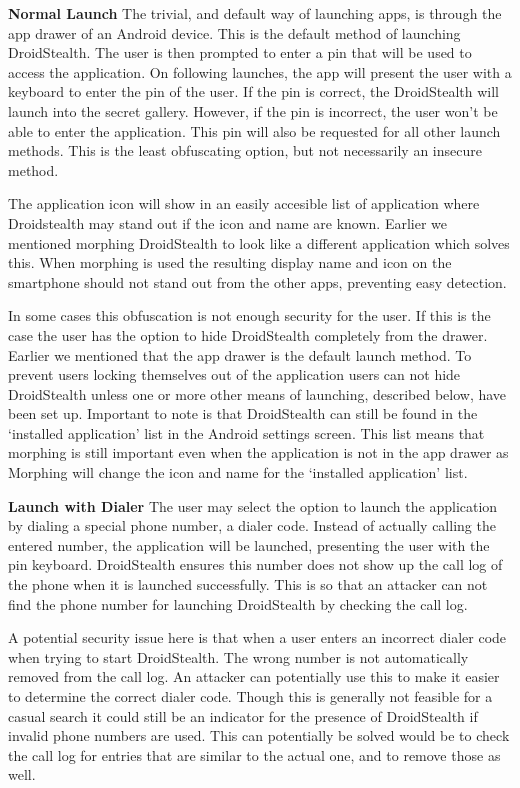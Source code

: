 \textbf{Normal Launch}
The trivial, and default way of launching apps, is through the app drawer of an Android device. 
This is the default method of launching DroidStealth.
The user is then prompted to enter a pin that will be used to access the application.
On following launches, the app will present the user with a keyboard to enter the pin of the user. 
If the pin is correct, the DroidStealth will launch into the secret gallery.
However, if the pin is incorrect, the user won't be able to enter the application.
This pin will also be requested for all other launch methods.
This is the least obfuscating option, but not necessarily an insecure method.

The application icon will show in an easily accesible list of application where Droidstealth may stand out if the icon and name are known.
Earlier we mentioned morphing DroidStealth to look like a different application which solves this.
When morphing is used the resulting display name and icon on the smartphone should not stand out from the other apps, preventing easy detection.

In some cases this obfuscation is not enough security for the user.
If this is the case the user has the option to hide DroidStealth completely from the drawer.
Earlier we mentioned that the app drawer is the default launch method.
To prevent users locking themselves out of the application users can not hide DroidStealth unless one or more other means of launching, described below, have been set up.
Important to note is that DroidStealth can still be found in the `installed application' list in the Android settings screen.
This list means that morphing is still important even when the application is not in the app drawer as Morphing will change the icon and name for the `installed application' list.

\textbf{Launch with Dialer}
The user may select the option to launch the application by dialing a special phone number, a dialer code. 
Instead of actually calling the entered number, the application will be launched, presenting the user with the pin keyboard. 
DroidStealth ensures this number does not show up the call log of the phone when it is launched successfully.
This is so that an attacker can not find the phone number for launching DroidStealth by checking the call log.

A potential security issue here is that when a user enters an incorrect dialer code when trying to start DroidStealth.
The wrong number is not automatically removed from the call log. 
An attacker can potentially use this to make it easier to determine the correct dialer code.
Though this is generally not feasible for a casual search it could still be an indicator for the presence of DroidStealth if invalid phone numbers are used.
This can potentially be solved would be to check the call log for entries that are similar to the actual one, and to remove those as well.

